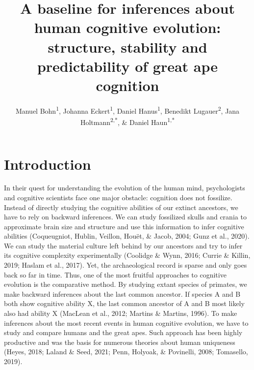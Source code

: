 \documentclass[
  man,floatsintext]{apa6}
\title{A baseline for inferences about human cognitive evolution: structure, stability and predictability of great ape cognition}
\author{Manuel Bohn\textsuperscript{1}, Johanna Eckert\textsuperscript{1}, Daniel Hanus\textsuperscript{1}, Benedikt Lugauer\textsuperscript{2}, Jana Holtmann\textsuperscript{2,*}, \& Daniel Haun\textsuperscript{1,*}}
\date{}
\affiliation{\vspace{0.5cm}\textsuperscript{1} Department of Comparative Cultural Psychology, Max Planck Institute for Evolutionary Anthropology, Leipzig, Germany\\\textsuperscript{2} Psychologische Hochschule Berlin, Berlin, Germany\\\textsuperscript{*} Shared senior authorship}
\begin{document}
\maketitle

\hypertarget{introduction}{%
\section{Introduction}\label{introduction}}

In their quest for understanding the evolution of the human mind, psychologists and cognitive scientists face one major obstacle: cognition does not fossilize. Instead of directly studying the cognitive abilities of our extinct ancestors, we have to rely on backward inferences. We can study fossilized skulls and crania to approximate brain size and structure and use this information to infer cognitive abilities (Coqueugniot, Hublin, Veillon, Houët, \& Jacob, 2004; Gunz et al., 2020). We can study the material culture left behind by our ancestors and try to infer its cognitive complexity experimentally (Coolidge \& Wynn, 2016; Currie \& Killin, 2019; Haslam et al., 2017). Yet, the archaeological record is sparse and only goes back so far in time. Thus, one of the most fruitful approaches to cognitive evolution is the comparative method. By studying extant species of primates, we make backward inferences about the last common ancestor. If species A and B both show cognitive ability X, the last common ancestor of A and B most likely also had ability X (MacLean et al., 2012; Martins \& Martins, 1996). To make inferences about the most recent events in human cognitive evolution, we have to study and compare humans and the great apes. Such approach has been highly productive and was the basis for numerous theories about human uniqueness (Heyes, 2018; Laland \& Seed, 2021; Penn, Holyoak, \& Povinelli, 2008; Tomasello, 2019).
\end{document}
